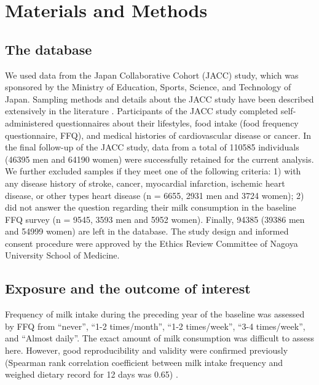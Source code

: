 \documentclass[nutrients,article,submit,moreauthors,pdftex]{mdpi}
\begin{document}
\hypertarget{materials-and-methods}{%
\section{Materials and Methods}\label{materials-and-methods}}

\hypertarget{the-database}{%
\subsection{The database}\label{the-database}}

We used data from the Japan Collaborative Cohort (JACC) study, which was
sponsored by the Ministry of Education, Sports, Science, and Technology
of Japan. Sampling methods and details about the JACC study have been
described extensively in the literature
\citep{Ohno2001, Tamakoshi2005, Tamakoshi2013}. Participants of the JACC
study completed self-administered questionnaires about their lifestyles,
food intake (food frequency questionnaire, FFQ), and medical histories
of cardiovascular disease or cancer. In the final follow-up of the JACC
study, data from a total of 110585 individuals (46395 men and 64190
women) were successfully retained for the current analysis. We further
excluded samples if they meet one of the following criteria: 1) with any
disease history of stroke, cancer, myocardial infarction, ischemic heart
disease, or other types heart disease (n = 6655, 2931 men and 3724
women); 2) did not answer the question regarding their milk consumption
in the baseline FFQ survey (n = 9545, 3593 men and 5952 women). Finally,
94385 (39386 men and 54999 women) are left in the database. The study
design and informed consent procedure were approved by the Ethics Review
Committee of Nagoya University School of Medicine.

\hypertarget{exposure-and-the-outcome-of-interest}{%
\subsection{Exposure and the outcome of
interest}\label{exposure-and-the-outcome-of-interest}}

Frequency of milk intake during the preceding year of the baseline was
assessed by FFQ from ``never'', ``1-2 times/month'', ``1-2 times/week'',
``3-4 times/week'', and ``Almost daily''. The exact amount of milk
consumption was difficult to assess here. However, good reproducibility
and validity were confirmed previously (Spearman rank correlation
coefficient between milk intake frequency and weighed dietary record for
12 days was 0.65) \citep{Date2005}.
\end{document}
